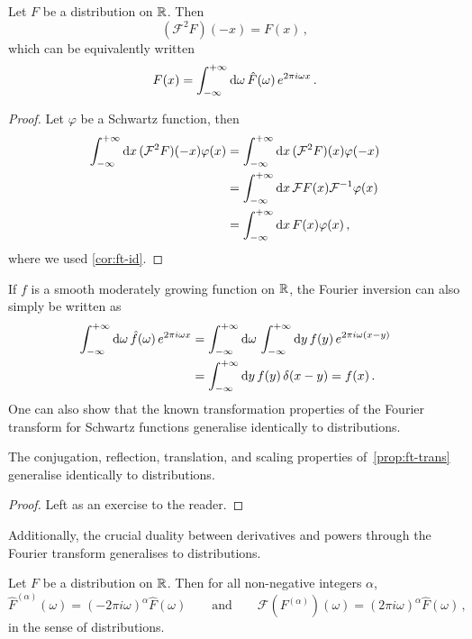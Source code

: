 \begin{theorem}
  Let $F$ be a distribution on $\mathbb{R}$. Then
  \begin{equation}
    (\mathcal{F}^2F)(-x)=F(x)\,,
  \end{equation}
  which can be equivalently written
  \begin{equation}
    F(x)=\int_{-\infty}^{+\infty}\mathrm{d}{\omega}\,\hat{F}(\omega)\,e^{2\pi i\omega x}\,.
  \end{equation}
\end{theorem}
\begin{proof}
  Let $\varphi$ be a Schwartz function, then
  \begin{align}
    \int_{-\infty}^{+\infty}\mathrm{d}{x}\,(\mathcal{F}^2F)(-x)\varphi(x)&=\int_{-\infty}^{+\infty}\mathrm{d}{x}\,(\mathcal{F}^2F)(x)\varphi(-x)\notag\\
    &=\int_{-\infty}^{+\infty}\mathrm{d}{x}\,\mathcal{F}F(x)\mathcal{F}^{-1}\varphi(x)\notag\\
    &=\int_{-\infty}^{+\infty}\mathrm{d}{x}\,F(x)\varphi(x)\,,
  \end{align}
  where we used \cref{cor:ft-id}.
\end{proof}
If $f$ is a smooth moderately growing function on $\mathbb{R}$, the Fourier inversion can also
simply be written as
\begin{align}
  \int_{-\infty}^{+\infty}\mathrm{d}{\omega}\,\hat{f}(\omega)\,e^{2\pi i\omega x}&=
  \int_{-\infty}^{+\infty}\mathrm{d}{\omega}\,\int_{-\infty}^{+\infty}\mathrm{d}{y}\,f(y)\,e^{2\pi i\omega (x-y)}\notag\\
  &=\int_{-\infty}^{+\infty}\mathrm{d}{y}\,f(y)\,\delta(x-y)=f(x)\,.
\end{align}
One can also show that the known transformation properties of the Fourier transform for
Schwartz functions generalise identically to distributions.
\begin{proposition}
  The conjugation, reflection, translation, and scaling properties of~\cref{prop:ft-trans}
  generalise identically to distributions.
\end{proposition}
\begin{proof}
  Left as an exercise to the reader.
\end{proof}
Additionally, the crucial duality between derivatives and powers through the Fourier
transform generalises to distributions.
\begin{proposition}
  Let $F$ be a distribution on $\mathbb{R}$. Then for all non-negative integers $\alpha$,
  \begin{equation}
    \hat{F}^{(\alpha)}(\omega)=(-2\pi i\omega)^\alpha\hat{F}(\omega)
    \qquad\text{and}\qquad
    \mathcal{F}(F^{(\alpha)})(\omega)=(2\pi i\omega)^{\alpha}\hat{F}(\omega)\,,
  \end{equation}
  in the sense of distributions.
\end{proposition}
